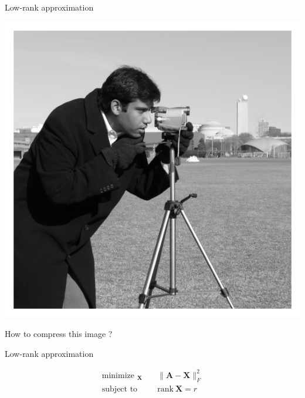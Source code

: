 \documentclass[aspectratio=169, usenames, dvipsnames]{beamer}
\DeclareMathOperator*{\minimize}{minimize~}
\DeclareMathOperator*{\subto}{subject~to~}
\begin{document}
\begin{frame}{Low-rank approximation}
  \centering

  \includegraphics[height=.75\textheight]{data/camera}

  How to compress this image ?
\end{frame}

\begin{frame}{Low-rank approximation}
    \vfill

    \Large
    \[
    \begin{aligned}
      \minimize_{\bm{X}} & \quad \| \bm{A} - \bm{X} \|_F^2 \\
      \subto & \quad \mathrm{rank~} \bm{X} = r
    \end{aligned}
    \]

    \vfill
\end{frame}
\end{document}
